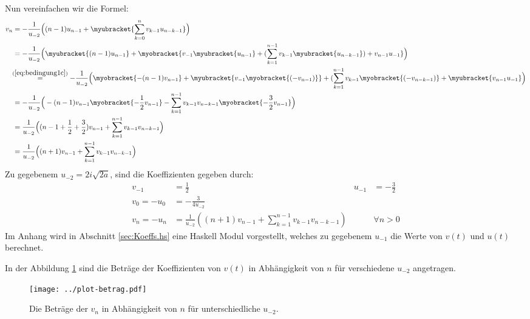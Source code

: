\begin{comment}
und analog, für $n=1$ und $n=2$
\begin{align*}
v_1&= -\frac{3}{2u_{-2}^2} = \frac{3}{16a} = -u_1 &\mbox{und}
  & & v_2&= -\frac{63}{16u_{-2}^3} = -\frac{63i}{256a\sqrt{2a}} = -u_2 \,.
\end{align*}
Die letzten zwei Paare sind für die Berechnung nicht von Bedeutung und dienen
nur dazu, das Programm zu prüfen.
\end{comment}
Nun vereinfachen wir die Formel:
\begin{align*}
v_{n} &= -\frac{1}{u_{-2}}
  \Big((n-1)u_{n-1} + \myubracket{\sum_{k=0}^{n} v_{k-1}u_{n-k-1}}\Big)
\\&= -\frac{1}{u_{-2}}
  \Big(\myubracket{(n-1)u_{n-1}} + \myobracket{v_{-1}\myubracket{u_{n-1}}
  + (\sum_{k=1}^{n-1} v_{k-1}\myubracket{u_{n-k-1}}) + v_{n-1}u_{-1}}\Big)
\\&\!\!\overset{(\ref{eq:bedingung1c})}{=} -\frac{1}{u_{-2}}
  \Big(\myobracket{-(n-1)v_{n-1}} + \myubracket{v_{-1}\myobracket{(-v_{n-1})}}
  + (\sum_{k=1}^{n-1} v_{k-1}\myobracket{(-v_{n-k-1})}
  + \myubracket{v_{n-1}u_{-1}}\Big)
\\&= -\frac{1}{u_{-2}} \Big(-(n-1)v_{n-1} \myobracket{-\frac{1}{2}v_{n-1}}
  - \sum_{k=1}^{n-1} v_{k-1}v_{n-k-1} \myobracket{- \frac{3}{2} v_{n-1}}\Big)
\\&= \frac{1}{u_{-2}} \Big((n-1+\frac{1}{2}+\frac{3}{2})v_{n-1}
  + \sum_{k=1}^{n-1} v_{k-1}v_{n-k-1}\Big)
\\&=\frac{1}{u_{-2}} \Big((n+1)v_{n-1} + \sum_{k=1}^{n-1} v_{k-1}v_{n-k-1}\Big)
\end{align*}
Zu gegebenem $u_{-2}=2i\sqrt{2a}$, sind die Koeffizienten gegeben durch:
\begin{align*}
v_{-1}&=\frac{1}{2} & u_{-1}&=-\frac{3}{2}
\\v_{0} = -u_{0} &= -\frac{3}{4u_{-2}}
\\v_n = - u_n &= \frac{1}{u_{-2}}
  \left((n+1)v_{n-1} + \sum_{k=1}^{n-1} v_{k-1}v_{n-k-1}\right)
  & & \forall n > 0
\end{align*}
Im Anhang wird in Abschnitt \ref{sec:Koeffs.hs} eine Haskell Modul vorgestellt,
welches zu gegebenem $u_{-1}$ die Werte von $v(t)$ und $u(t)$ berechnet.

In der Abbildung \ref{fig:plotKoeffs} sind die Beträge der Koeffizienten von
$v(t)$ in Abhängigkeit von $n$ für verschiedene $u_{-2}$ angetragen.
\begin{figure}[htbp]
  \centering
  \texttt{[image: ../plot-betrag.pdf]}
  \caption%
   {Die Beträge der $v_n$ in Abhängigkeit von $n$ für unterschiedliche
     $u_{-2}$.}
  \label{fig:plotKoeffs}
\end{figure}

